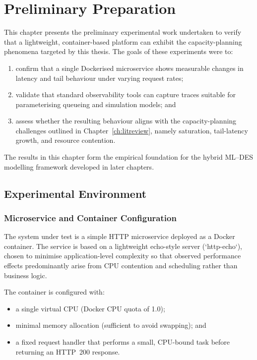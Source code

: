 
\chapter{Preliminary Preparation}
\label{ch:prelim}

This chapter presents the preliminary experimental work undertaken to
verify that a lightweight, container-based platform can exhibit the
capacity-planning phenomena targeted by this thesis. The goals of these
experiments were to:

\begin{enumerate}
    \item confirm that a single Dockerised microservice shows measurable
    changes in latency and tail behaviour under varying request rates;
    \item validate that standard observability tools can capture traces
    suitable for parameterising queueing and simulation models; and
    \item assess whether the resulting behaviour aligns with the
    capacity-planning challenges outlined in Chapter~\ref{ch:litreview},
    namely saturation, tail-latency growth, and resource contention.
\end{enumerate}

The results in this chapter form the empirical foundation for the
hybrid ML--DES modelling framework developed in later chapters.

\section{Experimental Environment}
\label{sec:prelim-env}

\subsection{Microservice and Container Configuration}

The system under test is a simple HTTP microservice deployed as a Docker
container. The service is based on a lightweight echo-style server
(`http-echo`), chosen to minimise application-level complexity so that
observed performance effects predominantly arise from CPU contention and
scheduling rather than business logic.

The container is configured with:
\begin{itemize}
    \item a single virtual CPU (Docker CPU quota of 1.0);
    \item minimal memory allocation (sufficient to avoid swapping); and
    \item a fixed request handler that performs a small, CPU-bound task
    before returning an HTTP~200 response.
\end{itemize}

